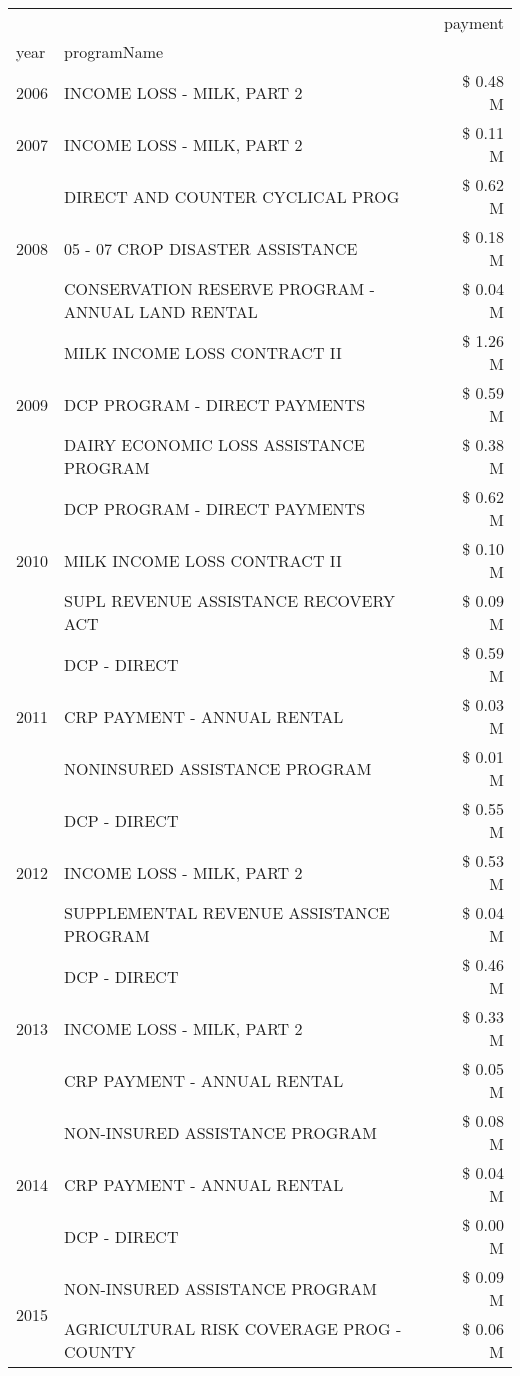 \begin{tabular}{llr}
\toprule
 &  & payment \\
year & programName &  \\
\midrule
2006 & INCOME LOSS - MILK, PART 2 & \$ 0.48 M \\
\cline{1-3}
2007 & INCOME LOSS - MILK, PART 2 & \$ 0.11 M \\
\cline{1-3}
\multirow[t]{3}{*}{2008} & DIRECT AND COUNTER CYCLICAL PROG & \$ 0.62 M \\
 & 05 - 07 CROP DISASTER ASSISTANCE & \$ 0.18 M \\
 & CONSERVATION RESERVE PROGRAM - ANNUAL LAND RENTAL & \$ 0.04 M \\
\cline{1-3}
\multirow[t]{3}{*}{2009} & MILK INCOME LOSS CONTRACT II & \$ 1.26 M \\
 & DCP PROGRAM - DIRECT PAYMENTS & \$ 0.59 M \\
 & DAIRY ECONOMIC LOSS ASSISTANCE PROGRAM & \$ 0.38 M \\
\cline{1-3}
\multirow[t]{3}{*}{2010} & DCP PROGRAM - DIRECT PAYMENTS & \$ 0.62 M \\
 & MILK INCOME LOSS CONTRACT II & \$ 0.10 M \\
 & SUPL REVENUE ASSISTANCE RECOVERY ACT & \$ 0.09 M \\
\cline{1-3}
\multirow[t]{3}{*}{2011} & DCP - DIRECT & \$ 0.59 M \\
 & CRP PAYMENT - ANNUAL RENTAL & \$ 0.03 M \\
 & NONINSURED ASSISTANCE PROGRAM & \$ 0.01 M \\
\cline{1-3}
\multirow[t]{3}{*}{2012} & DCP - DIRECT & \$ 0.55 M \\
 & INCOME LOSS - MILK, PART 2 & \$ 0.53 M \\
 & SUPPLEMENTAL REVENUE ASSISTANCE PROGRAM & \$ 0.04 M \\
\cline{1-3}
\multirow[t]{3}{*}{2013} & DCP - DIRECT & \$ 0.46 M \\
 & INCOME LOSS - MILK, PART 2 & \$ 0.33 M \\
 & CRP PAYMENT - ANNUAL RENTAL & \$ 0.05 M \\
\cline{1-3}
\multirow[t]{3}{*}{2014} & NON-INSURED ASSISTANCE PROGRAM & \$ 0.08 M \\
 & CRP PAYMENT - ANNUAL RENTAL & \$ 0.04 M \\
 & DCP - DIRECT & \$ 0.00 M \\
\cline{1-3}
\multirow[t]{3}{*}{2015} & NON-INSURED ASSISTANCE PROGRAM & \$ 0.09 M \\
 & AGRICULTURAL RISK COVERAGE PROG - COUNTY & \$ 0.06 M \\

\end{tabular}
